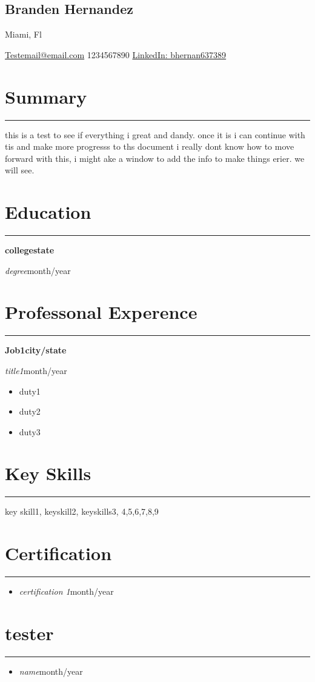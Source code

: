 \documentclass[11pt]{article}%
\newcommand{\resumesection}[1]{\vspace{-0.5cm}\section*{\color{highlight}#1}\vspace{-0.2cm}\hrule\vspace{0.2cm}}%
\newcommand{\location}[1]{\begin{center}\vspace{-0.1cm}#1\vspace{-0.3cm}\end{center}}%
\newcommand{\name}[1]{\begin{center}\section*{\LARGE \color{highlight}#1}\vspace{-0.8cm}\end{center}}%
\begin{document}
%
\normalsize%
\name{Branden Hernandez}%
\location{Miami, Fl}%
\begin{center}%
\href{mailto:email@domain}{Testemail@email.com}%
\vspace*{0.1cm}%
1234567890%
\vspace*{0.1cm}%
\href{https://www.linkedin.com/in/bhernan637389}{LinkedIn: bhernan637389}%
\end{center}%
\resumesection{Summary}%
this is a test to see if everything i great and dandy. once it is i can             continue with tis and make more progresss to ths document            i really dont know how to move forward with this, i might  ake a window to add the info to make            things erier. we will see.%
\resumesection{Education}%
\textbf{college}{\textbf{\hfill {state}}}%
\par%
\textit{degree}{\hfill {month/year}}%
\par%
\resumesection{Professonal Experence}%
\textbf{Job1}{\textbf{\hfill{city/state}}}%
\par%
\textit{title1}{\hfill{month/year}}%
\begin{itemize}%
\item%
duty1%
\item%
duty2%
\item%
duty3%
\end{itemize}%
\resumesection{Key Skills}%
key skill1, keyskill2, keyskills3, 4,5,6,7,8,9%
\resumesection{Certification}%
\begin{itemize}%
\item%
\textit{certification 1}{\hfill{month/year}}%
\end{itemize}%
\resumesection{tester}%
\begin{itemize}%
\item%
\textit{name}{\hfill{month/year}}%
\end{itemize}%
\end{document}
